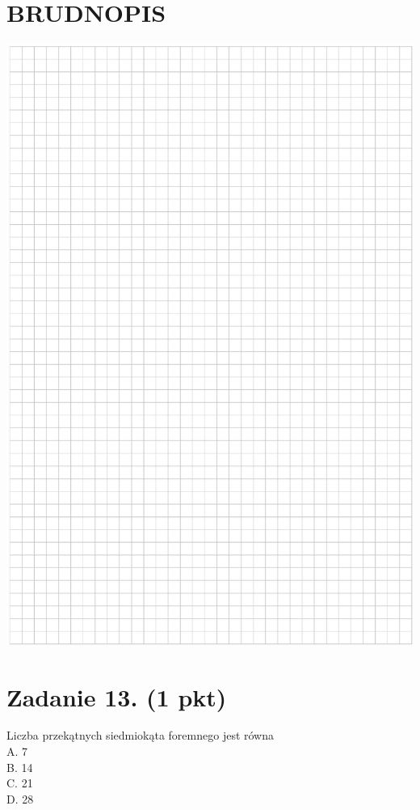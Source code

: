 \documentclass[10pt]{article}
\begin{document}
\section*{BRUDNOPIS}
\begin{center}
\includegraphics[max width=\textwidth]{2024_11_21_caf6b2e64dd65c9b24eeg-05}
\end{center}

\section*{Zadanie 13. (1 pkt)}
Liczba przekątnych siedmiokąta foremnego jest równa\\
A. 7\\
B. 14\\
C. 21\\
D. 28
\end{document}
